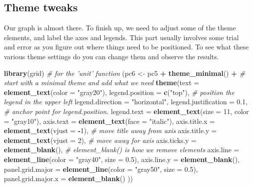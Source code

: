 \documentclass[]{book}
\newenvironment{Shaded}{\begin{snugshade}}{\end{snugshade}}
\newcommand{\KeywordTok}[1]{\textcolor[rgb]{0.13,0.29,0.53}{\textbf{#1}}}
\newcommand{\DataTypeTok}[1]{\textcolor[rgb]{0.13,0.29,0.53}{#1}}
\newcommand{\DecValTok}[1]{\textcolor[rgb]{0.00,0.00,0.81}{#1}}
\newcommand{\FloatTok}[1]{\textcolor[rgb]{0.00,0.00,0.81}{#1}}
\newcommand{\StringTok}[1]{\textcolor[rgb]{0.31,0.60,0.02}{#1}}
\newcommand{\CommentTok}[1]{\textcolor[rgb]{0.56,0.35,0.01}{\textit{#1}}}
\newcommand{\OperatorTok}[1]{\textcolor[rgb]{0.81,0.36,0.00}{\textbf{#1}}}
\newcommand{\NormalTok}[1]{#1}
\begin{document}
\subsection{Theme tweaks}\label{theme-tweaks}

Our graph is almost there. To finish up, we need to adjust some of the
theme elements, and label the axes and legends. This part usually
involves some trial and error as you figure out where things need to be
positioned. To see what these various theme settings do you can change
them and observe the results.

\begin{Shaded}
\begin{Highlighting}[]
\KeywordTok{library}\NormalTok{(grid) }\CommentTok{# for the 'unit' function}
\NormalTok{(pc6 <-}\StringTok{ }\NormalTok{pc5 }\OperatorTok{+}
\StringTok{  }\KeywordTok{theme_minimal}\NormalTok{() }\OperatorTok{+}\StringTok{ }\CommentTok{# start with a minimal theme and add what we need}
\StringTok{  }\KeywordTok{theme}\NormalTok{(}\DataTypeTok{text =} \KeywordTok{element_text}\NormalTok{(}\DataTypeTok{color =} \StringTok{"gray20"}\NormalTok{),}
        \DataTypeTok{legend.position =} \KeywordTok{c}\NormalTok{(}\StringTok{"top"}\NormalTok{), }\CommentTok{# position the legend in the upper left }
        \DataTypeTok{legend.direction =} \StringTok{"horizontal"}\NormalTok{,}
        \DataTypeTok{legend.justification =} \FloatTok{0.1}\NormalTok{, }\CommentTok{# anchor point for legend.position.}
        \DataTypeTok{legend.text =} \KeywordTok{element_text}\NormalTok{(}\DataTypeTok{size =} \DecValTok{11}\NormalTok{, }\DataTypeTok{color =} \StringTok{"gray10"}\NormalTok{),}
        \DataTypeTok{axis.text =} \KeywordTok{element_text}\NormalTok{(}\DataTypeTok{face =} \StringTok{"italic"}\NormalTok{),}
        \DataTypeTok{axis.title.x =} \KeywordTok{element_text}\NormalTok{(}\DataTypeTok{vjust =} \OperatorTok{-}\DecValTok{1}\NormalTok{), }\CommentTok{# move title away from axis}
        \DataTypeTok{axis.title.y =} \KeywordTok{element_text}\NormalTok{(}\DataTypeTok{vjust =} \DecValTok{2}\NormalTok{), }\CommentTok{# move away for axis}
        \DataTypeTok{axis.ticks.y =} \KeywordTok{element_blank}\NormalTok{(), }\CommentTok{# element_blank() is how we remove elements}
        \DataTypeTok{axis.line =} \KeywordTok{element_line}\NormalTok{(}\DataTypeTok{color =} \StringTok{"gray40"}\NormalTok{, }\DataTypeTok{size =} \FloatTok{0.5}\NormalTok{),}
        \DataTypeTok{axis.line.y =} \KeywordTok{element_blank}\NormalTok{(),}
        \DataTypeTok{panel.grid.major =} \KeywordTok{element_line}\NormalTok{(}\DataTypeTok{color =} \StringTok{"gray50"}\NormalTok{, }\DataTypeTok{size =} \FloatTok{0.5}\NormalTok{),}
        \DataTypeTok{panel.grid.major.x =} \KeywordTok{element_blank}\NormalTok{()}
\NormalTok{        ))}
\end{Highlighting}
\end{Shaded}
\end{document}
